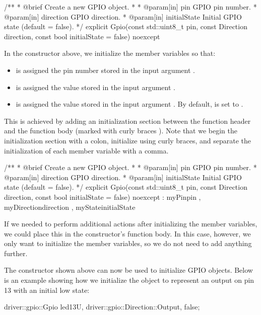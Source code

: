 \begin{cppcode}
/**
 * @brief Create a new GPIO object.
 *
 * @param[in] pin GPIO pin number.
 * @param[in] direction GPIO direction.
 * @param[in] initialState Initial GPIO state (default = false).
 */
explicit Gpio(const std::uint8_t pin, const Direction direction,
              const bool initialState = false) noexcept
{}
\end{cppcode}

\noindent In the constructor above, we initialize the member variables so that:
\begin{itemize}
  \item {} is assigned the pin number stored in the input argument .
  \item {} is assigned the value stored in the input argument .
  \item {} is assigned the value stored in the input argument . By
    default,  is set to .
\end{itemize}
This is achieved by adding an initialization section between the function header and the function
body (marked with curly braces \code{{}}). Note that we begin the initialization section with a
colon, initialize using curly braces, and separate the initialization of each member variable with
a comma.

\begin{cppcode}
/**
 * @brief Create a new GPIO object.
 *
 * @param[in] pin GPIO pin number.
 * @param[in] direction GPIO direction.
 * @param[in] initialState Initial GPIO state (default = false).
 */
explicit Gpio(const std::uint8_t pin, const Direction direction,
              const bool initialState = false) noexcept
    : myPin{pin}
    , myDirection{direction}
    , myState{initialState}
{}
\end{cppcode}

\noindent If we needed to perform additional actions after initializing the member variables, we
could place this in the constructor's function body. In this case, however, we only want to
initialize the member variables, so we do not need to add anything further.

The constructor shown above can now be used to initialize GPIO objects. Below is an example showing
how we initialize the object  to represent an output on pin 13 with an initial low
state:

\begin{cppcode}
driver::gpio::Gpio led{13U, driver::gpio::Direction::Output, false};
\end{cppcode}

